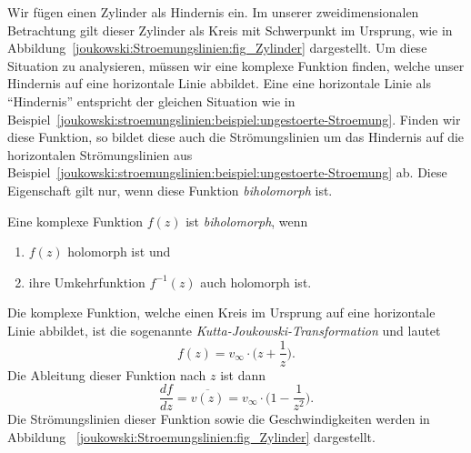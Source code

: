 		
		\begin{beispiel}
		\label{joukowski:stroemungslinien:beispiel:joukowski-transformation}
		Wir fügen einen Zylinder als Hindernis ein.
		Im unserer zweidimensionalen Betrachtung gilt dieser Zylinder als Kreis mit Schwerpunkt im Ursprung, wie in Abbildung~\ref{joukowski:Stroemungslinien:fig_Zylinder} dargestellt.
		Um diese Situation zu analysieren, müssen wir eine komplexe Funktion finden,
		welche unser Hindernis auf eine horizontale Linie abbildet.
		Eine eine horizontale Linie als ``Hindernis'' entspricht der gleichen Situation wie in Beispiel~\ref{joukowski:stroemungslinien:beispiel:ungestoerte-Stroemung}.
		Finden wir diese Funktion,
		so bildet diese auch die Strömungslinien um das Hindernis auf die horizontalen Strömungslinien aus Beispiel~\ref{joukowski:stroemungslinien:beispiel:ungestoerte-Stroemung} ab.
		Diese Eigenschaft gilt nur,
		wenn diese Funktion \emph{biholomorph} ist.
		
		\begin{definition}
			Eine komplexe Funktion $f(z)$ ist \emph{biholomorph}, wenn
%
			\begin{enumerate}
				\item $f(z)$ holomorph ist
				und
				\item ihre Umkehrfunktion $f^{-1}(z)$ auch holomorph ist.
			\end{enumerate}
		\end{definition}
		
		Die komplexe Funktion, welche einen Kreis im Ursprung auf eine horizontale Linie abbildet, ist die sogenannte \emph{Kutta-Joukowski-Transformation} und lautet
%
		\begin{equation}
			\label{joukowski:Stroemungslinien:equation_zylinder}
			f(z)
			=
			v_\infty \cdot \biggl(z+\frac{1}{z}\biggr).
		\end{equation}
		Die Ableitung dieser Funktion nach $z$ ist dann
		\begin{equation}
			\label{joukowski:Stroemungslinien:equation_zylinder_speed}
			\frac{df}{dz}
			=
			\overline{v(z)}
			=
			v_\infty \cdot \biggl(1 - \frac{1}{z^2}\biggr).
		\end{equation} 
		Die Strömungslinien dieser Funktion sowie die Geschwindigkeiten werden in Abbildung ~\ref{joukowski:Stroemungslinien:fig_Zylinder} dargestellt.
		\end{beispiel}
		

